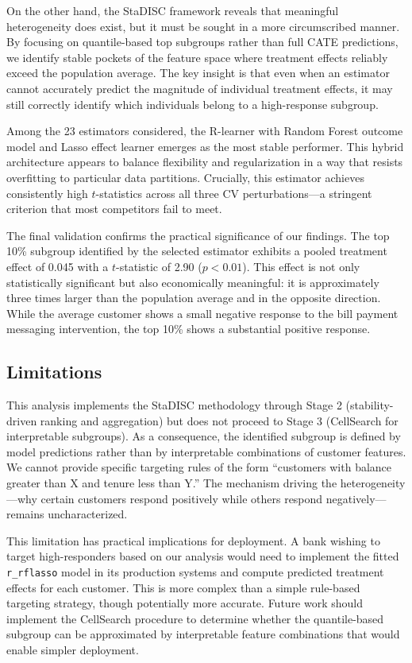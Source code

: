 \documentclass[11pt,a4paper]{article}
\begin{document}
On the other hand, the StaDISC framework reveals that meaningful heterogeneity does exist, but it must be sought in a more circumscribed manner. By focusing on quantile-based top subgroups rather than full CATE predictions, we identify stable pockets of the feature space where treatment effects reliably exceed the population average. The key insight is that even when an estimator cannot accurately predict the magnitude of individual treatment effects, it may still correctly identify which individuals belong to a high-response subgroup.

Among the 23 estimators considered, the R-learner with Random Forest outcome model and Lasso effect learner emerges as the most stable performer. This hybrid architecture appears to balance flexibility and regularization in a way that resists overfitting to particular data partitions. Crucially, this estimator achieves consistently high $t$-statistics across all three CV perturbations---a stringent criterion that most competitors fail to meet.

The final validation confirms the practical significance of our findings. The top 10\% subgroup identified by the selected estimator exhibits a pooled treatment effect of 0.045 with a $t$-statistic of 2.90 ($p < 0.01$). This effect is not only statistically significant but also economically meaningful: it is approximately three times larger than the population average and in the opposite direction. While the average customer shows a small negative response to the bill payment messaging intervention, the top 10\% shows a substantial positive response.

\subsection{Limitations}
This analysis implements the StaDISC methodology through Stage 2 (stability-driven ranking and aggregation) but does not proceed to Stage 3 (CellSearch for interpretable subgroups). As a consequence, the identified subgroup is defined by model predictions rather than by interpretable combinations of customer features. We cannot provide specific targeting rules of the form ``customers with balance greater than X and tenure less than Y.'' The mechanism driving the heterogeneity---why certain customers respond positively while others respond negatively---remains uncharacterized.

This limitation has practical implications for deployment. A bank wishing to target high-responders based on our analysis would need to implement the fitted \texttt{r\_rflasso} model in its production systems and compute predicted treatment effects for each customer. This is more complex than a simple rule-based targeting strategy, though potentially more accurate. Future work should implement the CellSearch procedure to determine whether the quantile-based subgroup can be approximated by interpretable feature combinations that would enable simpler deployment.
\end{document}
